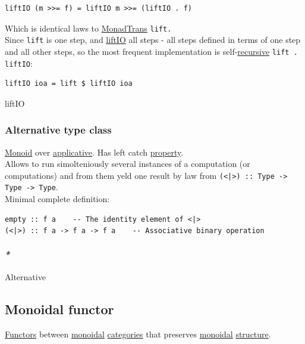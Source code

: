 \documentclass[a4paper,14pt,oneside]{book}
\begin{document}
{\begin{verbatim}
liftIO (m >>= f) = liftIO m >>= (liftIO . f)
\end{verbatim}

Which is identical laws to \hyperref[orgbc4eda7]{MonadTrans} \texttt{lift.}\\

Since \texttt{lift} is one step, and \hyperref[org6b77ad5]{liftIO} all steps - all steps defined in terms of one step and all other steps, so the most frequent implementation is self-\hyperref[org692ee3f]{recursive} \texttt{lift . liftIO}:\\

\begin{verbatim}
liftIO ioa = lift $ liftIO ioa
\end{verbatim}

\subsubsubsubparagraph{\emph{*}}
\label{sec:org447d92b}

\label{org6b77ad5}liftIO\\

\subsubsection{\label{org8ab9e52}Alternative type class}
\label{sec:org9ad73f0}
\hyperref[orgcf84af2]{Monoid} over \hyperref[org812e4b8]{applicative}. Has left catch \hyperref[org2731790]{property}.\\

Allows to run simolteniously several instances of a computation (or computations) and from them yeld one result by law from \texttt{(<|>) :: Type -> Type -> Type}.\\

Minimal complete definition:\\
\begin{verbatim}
empty :: f a    -- The identity element of <|>
(<|>) :: f a -> f a -> f a    -- Associative binary operation
\end{verbatim}

\paragraph{\emph{*}}
\label{sec:org63a2b87}

\label{org4703b00}Alternative\\

\subsection{\label{org63ec427}Monoidal functor}
\label{sec:org30c90b1}
\hyperref[org4c9214f]{Functors} between \hyperref[orgaf25a8c]{monoidal} \hyperref[org418901f]{categories} that preserves \hyperref[orgaf25a8c]{monoidal} \hyperref[org080800e]{structure}.\\

}
\end{document}
